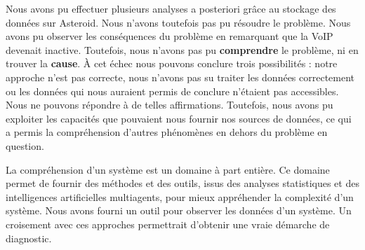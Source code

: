 Nous avons pu effectuer plusieurs analyses a posteriori grâce au stockage des données sur Asteroid. Nous n'avons toutefois pas pu résoudre le problème. Nous avons pu observer les conséquences du problème en remarquant que la VoIP devenait inactive. Toutefois, nous n'avons pas pu \textbf{comprendre} le problème, ni en trouver la \textbf{cause}. À cet échec nous pouvons conclure trois possibilités : notre approche n'est pas correcte, nous n'avons pas su traiter les données correctement ou les données qui nous auraient permis de conclure n'étaient pas accessibles. Nous ne pouvons répondre à de telles affirmations. Toutefois, nous avons pu exploiter les capacités que pouvaient nous fournir nos sources de données, ce qui a permis la compréhension d'autres phénomènes en dehors du problème en question.

La compréhension d'un système est un domaine à part entière. Ce domaine permet de fournir des méthodes et des outils, issus des analyses statistiques et des intelligences artificielles multiagents, pour mieux appréhender la complexité d'un système. Nous avons fourni un outil pour observer les données d'un système. Un croisement avec ces approches permettrait d'obtenir une vraie démarche de diagnostic.
